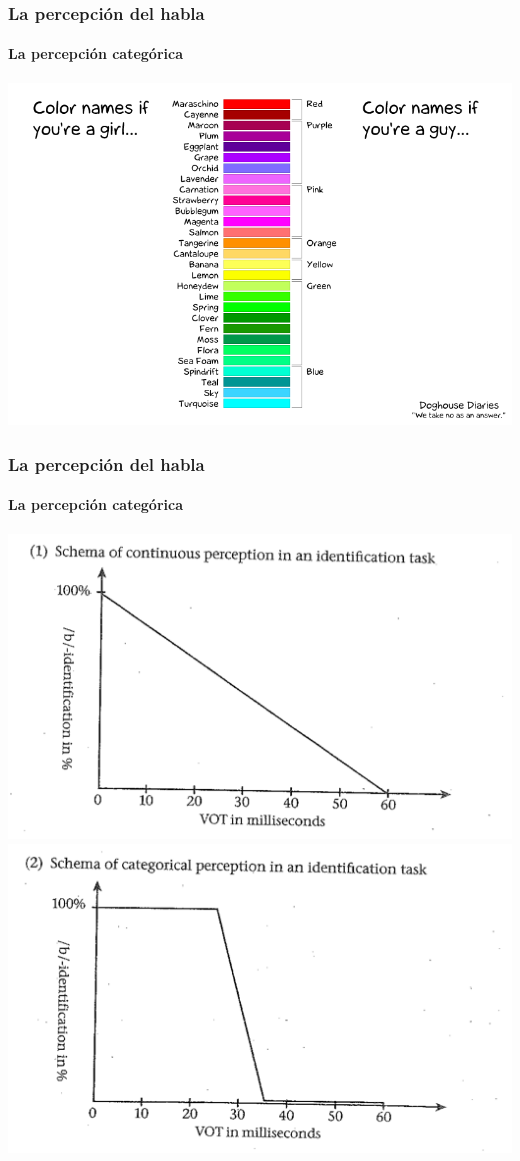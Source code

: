 \documentclass{beamer}
\begin{document}
\begin{frame}
	\frametitle{La percepción del habla}
	\framesubtitle{La percepción categórica}

	\begin{center}
		\includegraphics[width=.8\textwidth]{figures/colors.png}
	\end{center}
\end{frame}

\begin{frame}
	\frametitle{La percepción del habla}
	\framesubtitle{La percepción categórica}

	\begin{center}
		\includegraphics[scale=.3]{figures/pc1.png} \includegraphics[scale=.3]{figures/pc2.png}
	\end{center}
\end{frame}
\end{document}
